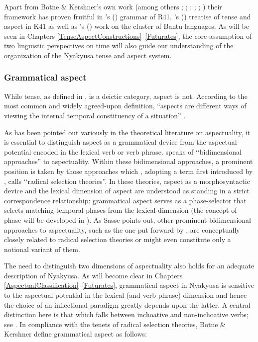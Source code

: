 Apart from Botne \& Kershner's own work (among others \citealt{BotneR2003b}; \citeyear{BotneR2006}; \citeyear{BotneR2008}; \citealt{BotneRKershnerT2000}; \citeyear{BotneRKershnerT2008}; \citealt{KershnerT2002}) their framework has proven fruitful in \citeauthor{SeidelF2008}'s (\citeyear{SeidelF2008}) grammar of  R41, \citeauthor{CraneTM2011}'s (\citeyear{CraneTM2011}) treatise of tense and aspect in  K41 as well as \citeauthor{DomSBostoenK2015}'s (\citeyear{DomSBostoenK2015}) work on the  cluster of Bantu languages. As will be seen in Chapters \ref{TenseAspectConstructions}--\ref{Futurates}, the core assumption of two linguistic perspectives on time will also guide our understanding of the organization of the Nyakyusa tense and aspect system.

 
\subsubsection{Grammatical aspect}\label{Aspect}
While tense, as defined in , is a deictic category, aspect is not. According to the most common and widely agreed-upon definition, ``aspects are different ways of viewing the internal temporal constituency of a situation'' \mbox{\citep[3]{ComrieB1976}.}

\newpage 
As has been pointed out variously in the theoretical literature on aspectuality, it is essential to distinguish aspect as a grammatical device from the aspectual potential encoded in the lexical verb or verb phrase. \citet{SasseHJ2002} speaks of \lq\lq bidimensional approaches'' to aspectuality. Within these bidimensional approaches, a prominent position is taken by those approaches which \citet{SasseHJ2002}, adopting a term first introduced by \citet{BickelB1997}, calls \lq\lq radical selection theories''. In these theories, aspect as a morphosyntactic device and the lexical dimension of aspect are understood as standing in a strict correspondence relationship: grammatical aspect serves as a phase-selector that selects matching temporal phases from the lexical dimension (the concept of phase will be developed in ). As Sasse points out, other prominent bidimensional approaches to aspectuality, such as the one put forward by \citet{SmithC1997}, are conceptually closely related to radical selection theories or might even constitute only a notional variant of them.

The need to distinguish two dimensions of aspectuality also holds for an adequate description of Nyakyusa. As will become clear in Chapters \ref{AspectualClassification}--\ref{Futurates}, grammatical aspect in Nyakyusa is sensitive to the aspectual potential in the lexical (and verb phrase) dimension and hence the choice of an inflectional paradigm greatly depends upon the latter. A central distinction here is that which falls between inchoative and non-inchoative verbs; see . In compliance with the tenets of radical selection theories, Botne \& Kershner define grammatical aspect as follows:

